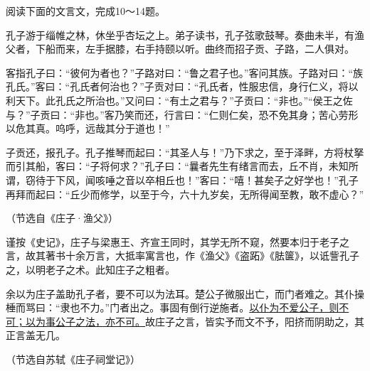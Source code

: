 \documentclass[11pt,a4paper]{ctexart}
\begin{document}

\par\vspace{2.2em}


\par\vspace{2.2em}

阅读下面的文言文，完成10～14题。

\begin{materialtext}
孔子游于缁帷之林，休坐乎杏坛之上。弟子读书，孔子弦歌鼓琴。奏曲未半，有渔父者，下船而来，左手据膝，右手持颐以听。曲终而招子贡、子路，二人俱对。

客指孔子曰：“彼何为者也？”子路对曰：“鲁之君子也。”客问其族。子路对曰：“族孔氏。”客曰：“孔氏者何治也？”子贡对曰：“孔氏者，性服忠信，身行仁义，将以利天下。此孔氏之所治也。”又问曰：“有土之君与？”子贡曰：“非也。”“侯王之佐与？”子贡曰：“非也。”客乃笑而还，行言曰：“仁则仁矣，恐不免其身；苦心劳形以危其真。呜呼，远哉其分于道也！”

子贡还，报孔子。孔子推琴而起曰：“其圣人与！”乃下求之，至于泽畔，方将杖拏而引其船，客曰：“子将何求？”孔子曰：“曩者先生有绪言而去，丘不肖，未知所谓，窃待于下风，闻咳唾之音以卒相丘也！”客曰：“嘻！甚矣子之好学也！”孔子再拜而起曰：“丘少而修学，以至于今，六十九岁矣，无所得闻至教，敢不虚心？”
\end{materialtext}
\begin{flushright}（节选自《庄子·渔父》）\end{flushright}

\begin{materialtext}
谨按《史记》，庄子与梁惠王、齐宣王同时，其学无所不窥，然要本归于老子之言，故其著书十余万言，大抵率寓言也，作《渔父》《盗跖》《胠箧》，以诋訾孔子之，以明老子之术。此知庄子之粗者。

余以为庄子盖助孔子者，要不可以为法耳。楚公子微服出亡，而门者难之。其仆操棰而骂曰：“隶也不力。”门者出之。事固有倒行逆施者。\uline{以仆为不爱公子，则不可；以为事公子之法，亦不可。}故庄子之言，皆实予而文不予，阳挤而阴助之，其正言盖无几。
\end{materialtext}
\begin{flushright}（节选自苏轼《庄子祠堂记》）\end{flushright}
\end{document}
